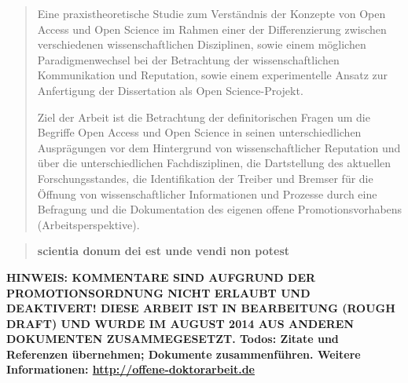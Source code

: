 
\begin{abstract}Eine praxistheoretische Studie zum Verständnis der Konzepte von Open Access und Open Science im Rahmen einer der Differenzierung zwischen verschiedenen wissenschaftlichen Disziplinen, sowie einem möglichen Paradigmenwechsel bei der Betrachtung der wissenschaftlichen Kommunikation und Reputation, sowie einem experimentelle Ansatz zur Anfertigung der Dissertation als Open Science-Projekt.

Ziel der Arbeit ist die Betrachtung der definitorischen Fragen um die Begriffe Open Access und Open Science in seinen unterschiedlichen Ausprägungen vor dem Hintergrund von wissenschaftlicher Reputation und über die unterschiedlichen Fachdisziplinen, die Dartstellung des aktuellen Forschungsstandes, die Identifikation der Treiber und Bremser für die Öffnung von wissenschaftlicher Informationen und Prozesse durch eine Befragung und die Dokumentation des eigenen offene Promotionsvorhabens (Arbeitsperspektive).
\end{abstract}


\begin{quote}
\textbf{scientia donum dei est unde vendi non potest}
\end{quote}


\textbf{HINWEIS: KOMMENTARE SIND AUFGRUND DER PROMOTIONSORDNUNG NICHT ERLAUBT UND DEAKTIVERT! DIESE ARBEIT IST IN BEARBEITUNG (ROUGH DRAFT) UND WURDE IM AUGUST 2014 AUS ANDEREN DOKUMENTEN ZUSAMMEGESETZT. Todos: Zitate und Referenzen übernehmen; Dokumente zusammenführen. Weitere Informationen: \href{http://offene-doktorarbeit.de}{http://offene-doktorarbeit.de}}
